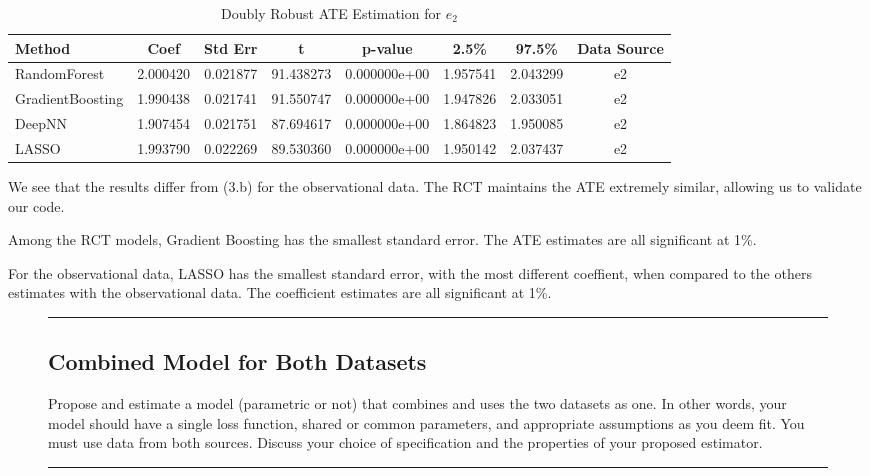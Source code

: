 \documentclass{article}
\newenvironment{colorparagraph}[1]{\par\color{#1}}{\par}
\begin{document}
\begin{table}[H]
  \centering
  \renewcommand{\arraystretch}{1.5}
  \begin{tabular}{|l|c|c|c|c|c|c|c|}
    \hline
    \textbf{Method} & \textbf{Coef} & \textbf{Std Err} & \textbf{t} & \textbf{p-value} & \textbf{2.5\%} & \textbf{97.5\%} & \textbf{Data Source} \\
    \hline
    RandomForest & 2.000420 & 0.021877 & 91.438273 & 0.000000e+00 & 1.957541 & 2.043299 & e2 \\ \hline
    GradientBoosting & 1.990438 & 0.021741 & 91.550747 & 0.000000e+00 & 1.947826 & 2.033051 & e2 \\ \hline
    DeepNN & 1.907454 & 0.021751 & 87.694617 & 0.000000e+00 & 1.864823 & 1.950085 & e2 \\ \hline
    LASSO & 1.993790 & 0.022269 & 89.530360 & 0.000000e+00 & 1.950142 & 2.037437 & e2 \\ \hline
  \end{tabular}
  \caption{Doubly Robust ATE Estimation for $e_2$}
\end{table}

We see that the results differ from (3.b) for the observational data. The RCT maintains the ATE extremely similar, allowing us to validate our code.

Among the RCT models, Gradient Boosting has the smallest standard error. The ATE estimates are all significant at 1\%.

For the observational data, LASSO has the smallest standard error, with the most different coeffient, when compared to the others estimates with the observational data. The coefficient estimates are all significant at 1\%.


\begin{figure}[H]
  \begin{colorparagraph}{questioncolor}
  \rule{\textwidth}{0.5pt}
  \label{q3e}
  \subsection{Combined Model for Both Datasets}

  Propose and estimate a model (parametric or not) that combines and uses the two datasets as one. In other words, your model should have a single loss function, shared or common parameters, and appropriate assumptions as you deem fit. You must use data from both sources. Discuss your choice of specification and the properties of your proposed estimator.

  \rule{\textwidth}{0.5pt}
  \end{colorparagraph}
\end{figure}
\end{document}

